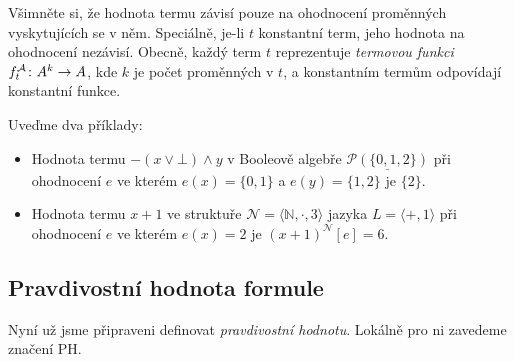 \begin{remark}
    Všimněte si, že hodnota termu závisí pouze na ohodnocení proměnných vyskytujících se v něm. Speciálně, je-li $t$ konstantní term, jeho hodnota na ohodnocení nezávisí.
    Obecně, každý term $t$ reprezentuje \emph{termovou funkci} $f_t^{\mathcal{A}}\colon A^k\to A$, kde $k$ je počet proměnných v $t$, a konstantním termům odpovídají konstantní funkce.
\end{remark}

\begin{example}
    Uveďme dva příklady:
    \begin{itemize}
        \item Hodnota termu $-(x\lor \bot)\land y$ v Booleově algebře $\underline{\mathcal P(\{0,1,2\})}$ při ohodnocení $e$ ve kterém $e(x)=\{0,1\}$ a $e(y)=\{1,2\}$ je $\{2\}$.
        \item Hodnota termu $x+1$ ve struktuře $\mathcal N=\langle\mathbb N,\cdot,3\rangle$ jazyka $L=\langle +,1\rangle$ při ohodnocení $e$ ve kterém $e(x)=2$ je $(x+1)^\mathcal N[e]=6$.
    \end{itemize}
\end{example}


\subsection{Pravdivostní hodnota formule}\label{subsection:truth-value-of-formula}

Nyní už jsme připraveni definovat \emph{pravdivostní hodnotu}. Lokálně pro ni zavedeme značení $\mathrm{PH}$.

